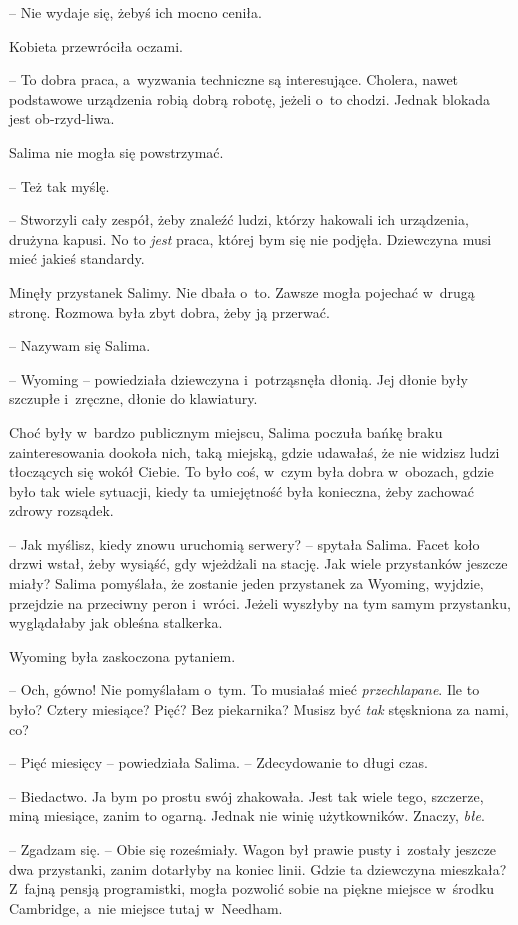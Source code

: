 \documentclass[oneside,polish,11pt,sfheadings]{mwbk}
\begin{document}
-- Nie wydaje się, żebyś ich mocno ceniła.

Kobieta przewróciła oczami. 

-- To dobra praca, a~wyzwania techniczne są
interesujące. Cholera, nawet podstawowe urządzenia robią dobrą robotę,
jeżeli o~to chodzi. Jednak blokada jest ob-rzyd-liwa.

Salima nie mogła się powstrzymać. 

-- Też tak myślę.

-- Stworzyli cały zespół, żeby znaleźć ludzi, którzy hakowali ich
urządzenia, drużyna kapusi. No to \textit{jest} praca, której bym się nie
podjęła. Dziewczyna musi mieć jakieś standardy.

Minęły przystanek Salimy. Nie dbała o~to. Zawsze mogła pojechać w~drugą
stronę. Rozmowa była zbyt dobra, żeby ją przerwać. 

-- Nazywam się Salima.

-- Wyoming -- powiedziała dziewczyna i~potrząsnęła dłonią. Jej dłonie były
szczupłe i~zręczne, dłonie do klawiatury.

Choć były w~bardzo publicznym miejscu, Salima poczuła bańkę braku
zainteresowania dookoła nich, taką miejską, gdzie udawałaś, że nie
widzisz ludzi tłoczących się wokół Ciebie. To było coś, w~czym była
dobra w~obozach, gdzie było tak wiele sytuacji, kiedy ta umiejętność
była konieczna, żeby zachować zdrowy rozsądek.

-- Jak myślisz, kiedy znowu uruchomią serwery? -- spytała Salima. Facet
koło drzwi wstał, żeby wysiąść, gdy wjeżdżali na stację. Jak wiele
przystanków jeszcze miały? Salima pomyślała, że zostanie jeden
przystanek za Wyoming, wyjdzie, przejdzie na przeciwny peron i~wróci.
Jeżeli wyszłyby na tym samym przystanku, wyglądałaby jak obleśna
stalkerka.

Wyoming była zaskoczona pytaniem. 

-- Och, gówno! Nie pomyślałam o~tym. To
musiałaś mieć \textit{przechlapane}. Ile to było? Cztery miesiące? Pięć?
Bez piekarnika? Musisz być \textit{tak} stęskniona za nami, co?

-- Pięć miesięcy -- powiedziała Salima. -- Zdecydowanie to długi czas.

-- Biedactwo. Ja bym po prostu swój zhakowała. Jest tak wiele tego,
szczerze, miną miesiące, zanim to ogarną. Jednak nie winię użytkowników.
Znaczy, \textit{błe}.

-- Zgadzam się. -- Obie się roześmiały. Wagon był prawie pusty i~zostały
jeszcze dwa przystanki, zanim dotarłyby na koniec linii. Gdzie ta
dziewczyna mieszkała? Z~fajną pensją programistki, mogła pozwolić sobie
na piękne miejsce w~środku Cambridge, a~nie miejsce tutaj w~Needham.
\end{document}
